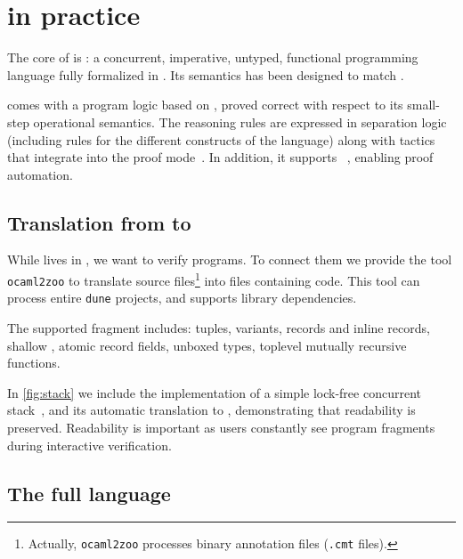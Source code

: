 \section{\Zoo in practice}
\label{sec:zoo}


The core of \Zoo is \ZooLang: a concurrent, imperative, untyped, functional programming language fully formalized in \Rocq.
Its semantics has been designed to match \OCaml.

\ZooLang comes with a program logic based on \Iris, proved correct with respect to its small-step operational semantics.
The reasoning rules are expressed in separation logic (including rules for the different constructs of the language) along with \Rocq tactics that integrate into the \Iris proof mode~\citep*{DBLP:journals/pacmpl/KrebbersJ0TKTCD18}.
In addition, it supports \Diaframe~\citep*{DBLP:conf/pldi/MulderKG22,DBLP:journals/pacmpl/MulderK23}, enabling proof automation.

\subsection{Translation from \OCaml to \ZooLang}



While \ZooLang lives in \Rocq, we want to verify \OCaml programs.
To connect them we provide the tool \texttt{ocaml2zoo} to translate \OCaml source files\footnote{Actually, \texttt{ocaml2zoo} processes binary annotation files (\texttt{.cmt} files).} into \Rocq files containing \ZooLang code.
This tool can process entire \texttt{dune} projects, and supports library dependencies.

The supported \OCaml fragment includes: tuples, variants, records and inline records, shallow , atomic record fields, unboxed types, toplevel mutually recursive functions.

In \cref{fig:stack} we include the \OCaml implementation of a simple lock-free concurrent stack~\citep*{thomas1986systems}, and its automatic translation to \ZooLang, demonstrating that readability is preserved.
Readability is important as users constantly see program fragments during interactive verification.

\subsection{The full language}

